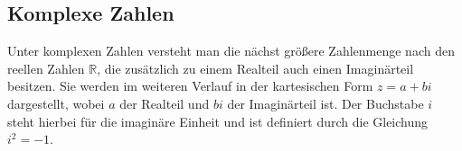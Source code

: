 \subsection{Komplexe Zahlen}\label{subsec:complex-numbers}

Unter komplexen Zahlen versteht man die nächst größere Zahlenmenge nach den reellen
Zahlen $\mathbb{R}$, die zus\"atzlich zu einem Realteil auch einen Imagin\"arteil
besitzen.
Sie werden im weiteren Verlauf in der kartesischen Form
\(z = a + bi\) dargestellt, wobei \(a\) der Realteil und \(bi\) der Imagin\"arteil ist.
Der Buchstabe \(i\) steht hierbei für die imaginäre Einheit und
ist definiert durch die Gleichung \(i^2 = -1\).
